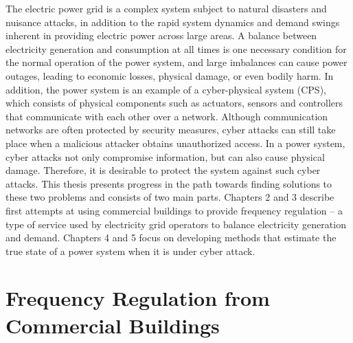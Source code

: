 \documentclass[../thesis.tex]{subfiles}
\begin{document}
The electric power grid is a complex system subject to natural disasters and nuisance attacks, in addition to the rapid system dynamics and demand swings inherent in providing electric power across large areas.
A balance between electricity generation and consumption at all times is one necessary condition for the normal operation of the power system, and large imbalances can cause power outages, leading to economic losses, physical damage, or even bodily harm.
In addition, the power system is an example of a cyber-physical system (CPS), which consists of physical components such as actuators, sensors and controllers that communicate with each other over a network. 
Although communication networks are often protected by security measures, cyber attacks can still take place when a malicious attacker obtains unauthorized access. %
In a power system, cyber attacks not only compromise information, but can also cause physical damage. 
Therefore, it is desirable to protect the system against such cyber attacks.
This thesis presents progress in the path towards finding solutions to these two problems and consists of two main parts.
Chapters 2 and 3 describe first attempts at using commercial buildings to provide frequency regulation -- a type of service used by electricity grid operators to balance electricity generation and demand. 
Chapters 4 and 5 focus on developing methods that estimate the true state of a power system when it is under cyber attack.




\section{Frequency Regulation from Commercial Buildings}
\end{document}
